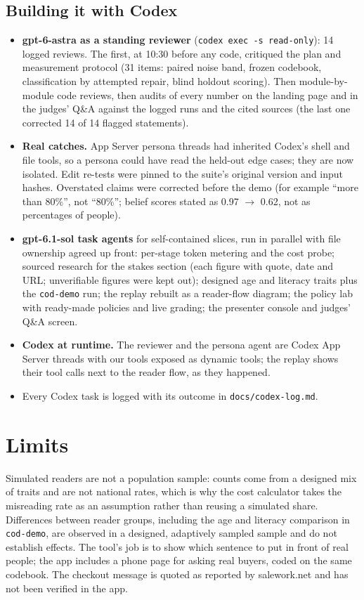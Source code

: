 \documentclass[11pt,a4paper]{article}
\newcommand{\code}[1]{\texttt{#1}}
\begin{document}
\subsection{Building it with Codex}
\begin{itemize}
  \item \textbf{gpt-6-astra as a standing reviewer} (\code{codex exec -s read-only}): 14 logged reviews. The first, at 10:30 before any code, critiqued the plan and measurement protocol (31 items: paired noise band, frozen codebook, classification by attempted repair, blind holdout scoring). Then module-by-module code reviews, then audits of every number on the landing page and in the judges' Q\&A against the logged runs and the cited sources (the last one corrected 14 of 14 flagged statements).
  \item \textbf{Real catches.} App Server persona threads had inherited Codex's shell and file tools, so a persona could have read the held-out edge cases; they are now isolated. Edit re-tests were pinned to the suite's original version and input hashes. Overstated claims were corrected before the demo (for example ``more than 80\%'', not ``80\%''; belief scores stated as 0.97 $\to$ 0.62, not as percentages of people).
  \item \textbf{gpt-6.1-sol task agents} for self-contained slices, run in parallel with file ownership agreed up front: per-stage token metering and the cost probe; sourced research for the stakes section (each figure with quote, date and URL; unverifiable figures were kept out); designed age and literacy traits plus the \code{cod-demo} run; the replay rebuilt as a reader-flow diagram; the policy lab with ready-made policies and live grading; the presenter console and judges' Q\&A screen.
  \item \textbf{Codex at runtime.} The reviewer and the persona agent are Codex App Server threads with our tools exposed as dynamic tools; the replay shows their tool calls next to the reader flow, as they happened.
  \item Every Codex task is logged with its outcome in \code{docs/codex-log.md}.
\end{itemize}

\section{Limits}
Simulated readers are not a population sample: counts come from a designed mix of traits and are not national rates, which is why the cost calculator takes the misreading rate as an assumption rather than reusing a simulated share. Differences between reader groups, including the age and literacy comparison in \code{cod-demo}, are observed in a designed, adaptively sampled sample and do not establish effects. The tool's job is to show which sentence to put in front of real people; the app includes a phone page for asking real buyers, coded on the same codebook. The checkout message is quoted as reported by salework.net and has not been verified in the app.
\end{document}
